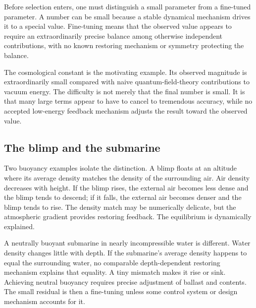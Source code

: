 Before selection enters, one must distinguish a small parameter from a fine-tuned parameter. A number can be small because a stable dynamical mechanism drives it to a special value. Fine-tuning means that the observed value appears to require an extraordinarily precise balance among otherwise independent contributions, with no known restoring mechanism or symmetry protecting the balance.

\begin{classroomqa}
\end{classroomqa}

The cosmological constant is the motivating example. Its observed magnitude is extraordinarily small compared with naive quantum-field-theory contributions to vacuum energy. The difficulty is not merely that the final number is small. It is that many large terms appear to have to cancel to tremendous accuracy, while no accepted low-energy feedback mechanism adjusts the result toward the observed value.

\subsection{The blimp and the submarine}

Two buoyancy examples isolate the distinction. A blimp floats at an altitude where its average density matches the density of the surrounding air. Air density decreases with height. If the blimp rises, the external air becomes less dense and the blimp tends to descend; if it falls, the external air becomes denser and the blimp tends to rise. The density match may be numerically delicate, but the atmospheric gradient provides restoring feedback. The equilibrium is dynamically explained.

A neutrally buoyant submarine in nearly incompressible water is different. Water density changes little with depth. If the submarine's average density happens to equal the surrounding water, no comparable depth-dependent restoring mechanism explains that equality. A tiny mismatch makes it rise or sink. Achieving neutral buoyancy requires precise adjustment of ballast and contents. The small residual is then a fine-tuning unless some control system or design mechanism accounts for it.


